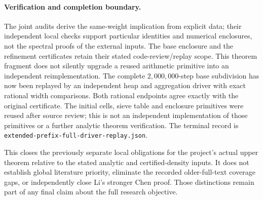 \paragraph{Verification and completion boundary.}
The joint audits derive the same-weight implication from explicit
data; their independent local checks support particular identities
and numerical enclosures, not the spectral proofs of the external
inputs. The base enclosure and the refinement certificates retain
their stated code-review/replay scope. This theorem fragment does
not silently upgrade a reused arithmetic primitive into an
independent reimplementation. The complete $2{,}000{,}000$-step base
subdivision has now been replayed by an independent heap and
aggregation driver with exact rational width comparisons. Both
rational endpoints agree exactly with the original certificate.
The initial cells, sieve table and enclosure primitives were reused
after source review; this is not an independent implementation of
those primitives or a further analytic theorem verification. The
terminal record is \texttt{extended-prefix-full-driver-replay.json}.

This closes the previously separate local obligations for the
project's actual upper theorem relative to the stated analytic
and certified-density inputs. It does not establish global
literature priority, eliminate the recorded older-full-text
coverage gaps, or independently close Li's stronger Chen proof.
Those distinctions remain part of any final claim about the
full research objective.

